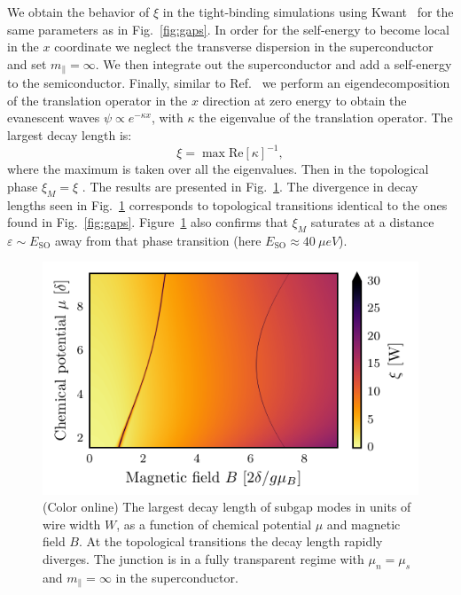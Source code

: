 We obtain the behavior of $\xi$ in the tight-binding simulations using Kwant~\cite{Groth2014} for the same parameters as in Fig.~\ref{fig:gaps}.
In order for the self-energy to become local in the $x$ coordinate we neglect the transverse dispersion in the superconductor and set $m_\parallel = \infty$.
We then integrate out the superconductor and add a self-energy to the semiconductor.
Finally, similar to Ref.~\cite{Nijholt2016} we perform an eigendecomposition of the translation operator in the $x$ direction at zero energy to obtain the evanescent waves $\psi\propto e^{-\kappa x}$, with $\kappa$ the eigenvalue of the translation operator.
The largest decay length is:
\begin{equation}\label{ximnum}
\xi = \max\mathrm{Re}[\kappa]^{-1},
\end{equation}
where the maximum is taken over all the eigenvalues.
Then in the topological phase $\xi_M = \xi$ .
The results are presented in Fig.~\ref{fig:decay_diag}.
The divergence in decay lengths seen in Fig.~\ref{fig:decay_diag} corresponds to topological transitions identical to the ones found in Fig.~\ref{fig:gaps}.
Figure~\ref{fig:decay_diag} also confirms that $\xi_M$ saturates at a distance $\varepsilon \sim E_\textrm{SO}$ away from that phase transition (here $E_\textrm{SO} \approx\SI{40}{\mu eV}$).

\begin{figure}[t]
\includegraphics[width=\columnwidth]{chapter_shortjunction/figures/decay_length_2d}
\caption{(Color online) The largest decay length of subgap modes in units of wire width $W$, as a function of chemical potential $\mu$ and magnetic field $B$.
At the topological transitions the decay length rapidly diverges.
The junction is in a fully transparent regime with $\mu_n=\mu_s$ and $m_\parallel =\infty$ in the superconductor.
}
\label{fig:decay_diag}
\end{figure}

